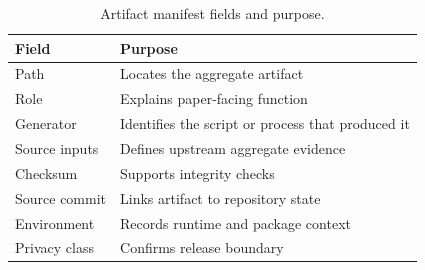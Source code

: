 \begin{table}[htbp]
\centering
\caption{Artifact manifest fields and purpose.}
\label{tab:manifest_schema}
\begin{tabularx}{\linewidth}{@{}lL@{}}
\toprule
Field & Purpose \\
\midrule
Path & Locates the aggregate artifact \\
Role & Explains paper-facing function \\
Generator & Identifies the script or process that produced it \\
Source inputs & Defines upstream aggregate evidence \\
Checksum & Supports integrity checks \\
Source commit & Links artifact to repository state \\
Environment & Records runtime and package context \\
Privacy class & Confirms release boundary \\
\bottomrule
\end{tabularx}
\end{table}

